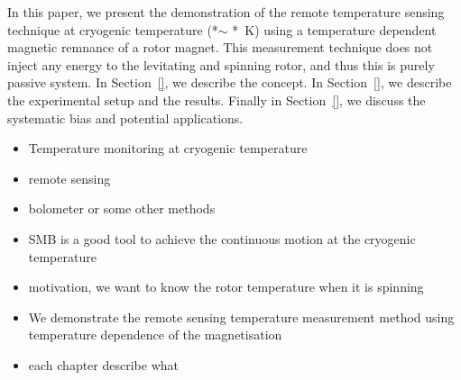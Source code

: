 In this paper, we present the demonstration of the remote temperature sensing technique at cryogenic temperature (*$\sim$ *~K) using a temperature dependent magnetic remnance of a rotor magnet. 
This measurement technique does not inject any energy to the levitating and spinning rotor, and thus this is purely passive system. 
In Section~\ref{}, we describe the concept. In Section~\ref{}, we describe the experimental setup and the results. Finally in Section~\ref{}, we discuss the systematic bias and potential applications.

\begin{itemize}
\item Temperature monitoring at cryogenic temperature
\item remote sensing
\item bolometer or some other methods
\item SMB is a good tool to achieve the continuous motion at the cryogenic temperature
\item motivation, we want to know the rotor temperature when it is spinning
\item We demonstrate the remote sensing temperature measurement method using temperature dependence of the magnetisation
\item each chapter describe what
\end{itemize}
